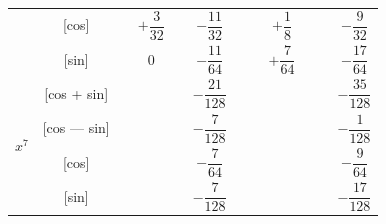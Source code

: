 \documentclass[11pt,a4paper]{book}
\begin{document}
\begin{center}
\begin{tabular}{|c|c|c|c|c|c|c|c|c|c|c|c|}
& [cos] & & $+\dfrac{3}{32}$ & & $-\dfrac{11}{32}$ & & & $+\dfrac{1}{8}$ & & & $-\dfrac{9}{32}$ \\
& [sin] & & $0$ & & $-\dfrac{11}{64}$ & & & $+\dfrac{7}{64}$ & & & $-\dfrac{17}{64}$ \\
\hline
\multirow{4}{*}{$x^7$} & [cos + sin] & & & & $-\dfrac{21}{128}$ & & & & & & $-\dfrac{35}{128}$ \\
& [cos --- sin] & & & & $-\dfrac{7}{128}$ & & & & & & $-\dfrac{1}{128}$ \\
& [cos] & & & & $-\dfrac{7}{64}$ & & & & & & $-\dfrac{9}{64}$ \\
& [sin] & & & & $-\dfrac{7}{128}$ & & & & & & $-\dfrac{17}{128}$ \\
\hline
\end{tabular}
\end{center}

\vspace{1em}

\end{document}
